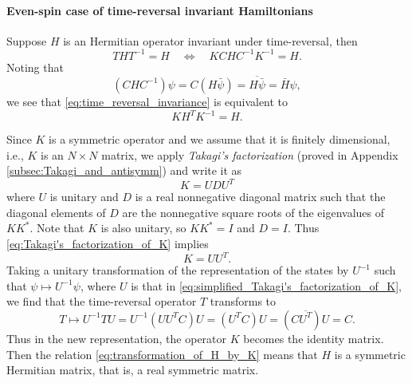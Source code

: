 \documentclass[11pt, a4paper]{article}
\numberwithin{equation}{section}
\newcommand{\ie}{i.e.}
\theoremstyle{definition}
\theoremstyle{remark}
\begin{document}
\paragraph{Even-spin case of time-reversal invariant Hamiltonians}

Suppose $H$ is an Hermitian operator invariant under time-reversal, then
\begin{equation} \label{eq:time_reversal_invariance}
  THT^{-1} = H \quad \Leftrightarrow \quad KCHC^{-1}K^{-1} = H.
\end{equation}
Noting that
\begin{equation}
  (CHC^{-1}) \psi = C(H \bar{\psi}) = \overline{H \bar{\psi}} = \bar{H} \psi,
\end{equation}
we see that \eqref{eq:time_reversal_invariance} is equivalent to
\begin{equation} \label{eq:transformation_of_H_by_K}
  K H^T K^{-1} = H.
\end{equation}

Since $K$ is a symmetric operator and we assume that it is finitely dimensional, \ie, $K$ is an $N \times N$ matrix, we apply \emph{Takagi's factorization} (proved in Appendix \ref{subsec:Takagi_and_antisymm}) and write it as
\begin{equation} \label{eq:Takagi's_factorization_of_K}
  K = U D U^T
\end{equation}
where $U$ is unitary and $D$ is a real nonnegative diagonal matrix such that the diagonal elements of $D$ are the nonnegative square roots of the eigenvalues of $KK^*$. Note that $K$ is also unitary, so $KK^* = I$ and $D = I$. Thus \eqref{eq:Takagi's_factorization_of_K} implies
\begin{equation} \label{eq:simplified_Takagi's_factorization_of_K}
  K = UU^T.
\end{equation}
Taking a unitary transformation of the representation of the states by $U^{-1}$ such that $\psi \mapsto U^{-1} \psi$, where $U$ is that in \eqref{eq:simplified_Takagi's_factorization_of_K}, we find that the time-reversal operator $T$ transforms to
\begin{equation}
  T \mapsto U^{-1} T U = U^{-1} (UU^T C) U = (U^T C) U = (C \overline{U^T}) U = C.
\end{equation}
Thus in the new representation, the operator $K$ becomes the identity matrix. Then the relation \eqref{eq:transformation_of_H_by_K} means that $H$ is a symmetric Hermitian matrix, that is, a real symmetric matrix.
\end{document}
